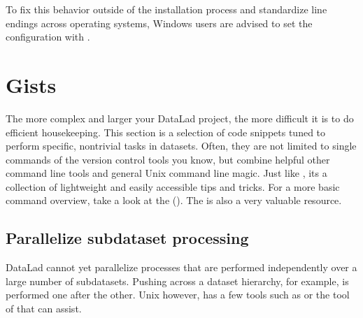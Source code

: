 \sphinxAtStartPar
To fix this behavior outside of the installation process and standardize line endings across operating systems, Windows users are advised to set the configuration  with .

\sphinxstepscope


\section{Gists}
\label{\detokenize{basics/101-146-gists:gists}}\label{\detokenize{basics/101-146-gists:id1}}\label{\detokenize{basics/101-146-gists::doc}}
\sphinxAtStartPar
The more complex and larger your DataLad project, the more difficult it is to do
efficient housekeeping.
This section is a selection of code snippets tuned to perform specific,
non\sphinxhyphen{}trivial tasks in datasets. Often, they are not limited to single commands of
the version control tools you know, but combine helpful other command line
tools and general Unix command line magic. Just like
, its a collection of lightweight
and easily accessible tips and tricks. For a more basic command overview,
take a look at the {\hyperref[\detokenize{basics/101-136-cheatsheet:cheat}]{}} (). The
 is also
a very valuable resource.



\subsection{Parallelize subdataset processing}
\label{\detokenize{basics/101-146-gists:parallelize-subdataset-processing}}\label{\detokenize{basics/101-146-gists:parallelize}}
\sphinxAtStartPar
DataLad cannot yet parallelize processes that are performed
independently over a large number of subdatasets. Pushing across a dataset
hierarchy, for example, is performed one after the other.
Unix however, has a few tools such as 
or the  tool of 
that can assist.

